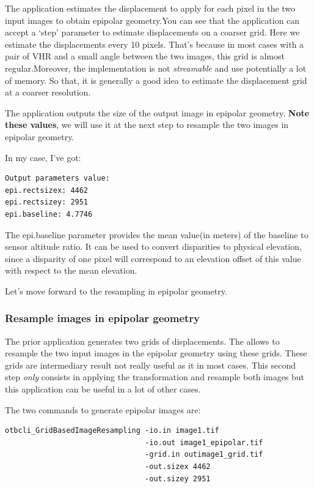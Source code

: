 The application estimates the displacement to apply for each pixel in the two
input images to obtain epipolar geometry.You can see that the application can
accept a `step' parameter to estimate displacements on a coarser grid. Here we
estimate the displacements every 10 pixels. That's because in most cases with a
pair of VHR and a small angle between the two images, this grid is almost
regular.Moreover, the implementation is not \textit{streamable} and use potentially a
lot of memory. So that, it is generally a good idea to estimate the displacement
grid at a coarser resolution.

The application outputs the size of the output image in epipolar
geometry. \textbf{Note these values}, we will use it at the next step to
resample the two images in epipolar geometry.

In my case, I've got:

\begin{verbatim}
Output parameters value:
epi.rectsizex: 4462
epi.rectsizey: 2951
epi.baseline: 4.7746
\end{verbatim}

The epi.baseline parameter provides the mean value(in meters) of the
baseline to sensor altitude ratio. It can be used to convert disparities to
physical elevation, since a disparity of one pixel will correspond to an
elevation offset of this value with respect to the mean elevation.

Let's move forward to the resampling in epipolar geometry.

\subsubsection{Resample images in epipolar geometry}

The prior application generates two grids of displacements. The
 allows to resample the two input images
in the epipolar geometry using these grids.  These grids are intermediary result
not really useful as it in most cases. This second step \textit{only} consists in
applying the transformation and resample both images but this application can be
useful in a lot of other cases.

The two commands to generate epipolar images are:
\begin{verbatim}
otbcli_GridBasedImageResampling -io.in image1.tif
                                -io.out image1_epipolar.tif
                                -grid.in outimage1_grid.tif
                                -out.sizex 4462
                                -out.sizey 2951
\end{verbatim}

